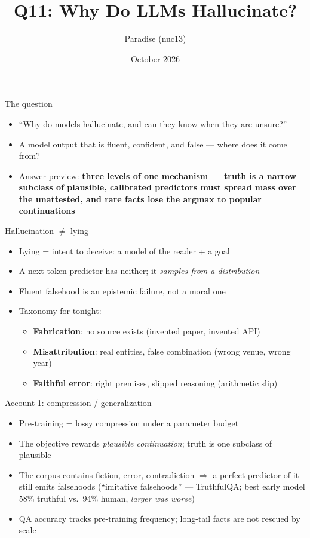 \documentclass[aspectratio=169,11pt]{beamer}
\title{Q11: Why Do LLMs Hallucinate?}
\author{Paradise (nuc13)}
\date{October 2026}
\begin{document}
\frame{\titlepage}

\begin{frame}{The question}
\begin{itemize}
\item ``Why do models hallucinate, and can they know when they are unsure?''
\item A model output that is fluent, confident, and false --- where does it come from?
\item Answer preview: \textbf{three levels of one mechanism --- truth is a narrow subclass of plausible, calibrated predictors must spread mass over the unattested, and rare facts lose the argmax to popular continuations}
\end{itemize}
\end{frame}

\begin{frame}{Hallucination $\neq$ lying}
\begin{itemize}
\item Lying = intent to deceive: a model of the reader + a goal
\item A next-token predictor has neither; it \emph{samples from a distribution}
\item Fluent falsehood is an epistemic failure, not a moral one
\item Taxonomy for tonight:
  \begin{itemize}
  \item \textbf{Fabrication}: no source exists (invented paper, invented API)
  \item \textbf{Misattribution}: real entities, false combination (wrong venue, wrong year)
  \item \textbf{Faithful error}: right premises, slipped reasoning (arithmetic slip)
  \end{itemize}
\end{itemize}
\end{frame}

\begin{frame}{Account 1: compression / generalization}
\begin{itemize}
\item Pre-training = lossy compression under a parameter budget
\item The objective rewards \emph{plausible continuation}; truth is one subclass of plausible
\item The corpus contains fiction, error, contradiction $\Rightarrow$ a perfect predictor of it still emits falsehoods (``imitative falsehoods'' --- TruthfulQA; best early model 58\% truthful vs.\ 94\% human, \emph{larger was worse})
\item QA accuracy tracks pre-training frequency; long-tail facts are not rescued by scale
\end{itemize}
\end{frame}
\end{document}
